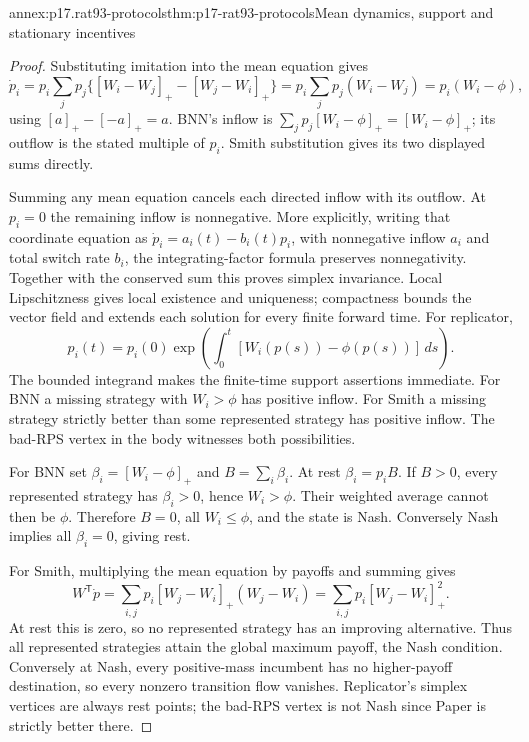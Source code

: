 \begin{annexitem}{annex:p17.rat93-protocols}{thm:p17-rat93-protocols}{Mean dynamics, support and stationary incentives}
\begin{proof}
Substituting imitation into the mean equation gives
\[
 \dot p_i=p_i\sum_jp_j\{[W_i-W_j]_+-[W_j-W_i]_+\}
          =p_i\sum_jp_j(W_i-W_j)=p_i(W_i-\phi),
\]
using \([a]_+-[-a]_+=a\). BNN's inflow is
\(\sum_jp_j[W_i-\phi]_+=[W_i-\phi]_+\); its outflow is
the stated multiple of \(p_i\). Smith substitution gives its two
displayed sums directly.

Summing any mean equation cancels each directed inflow with its
outflow. At \(p_i=0\) the remaining inflow is nonnegative. More
explicitly, writing that coordinate equation as
\(\dot p_i=a_i(t)-b_i(t)p_i\), with nonnegative inflow
\(a_i\) and total switch rate \(b_i\), the integrating-factor
formula preserves nonnegativity. Together with the conserved sum
this proves simplex invariance. Local Lipschitzness gives local
existence and uniqueness; compactness bounds the vector field and
extends each solution for every finite forward time. For replicator,
\[
 p_i(t)=p_i(0)\exp\!\left(\int_0^t[W_i(p(s))-\phi(p(s))]\,ds\right).
\]
The bounded integrand makes the finite-time support assertions immediate.
For BNN a missing strategy with \(W_i>\phi\) has positive inflow.
For Smith a missing strategy strictly better than some represented
strategy has positive inflow. The bad-RPS vertex in the body witnesses
both possibilities.

For BNN set \(\beta_i=[W_i-\phi]_+\) and \(B=\sum_i\beta_i\).
At rest \(\beta_i=p_iB\). If \(B>0\), every represented strategy
has \(\beta_i>0\), hence \(W_i>\phi\). Their weighted average
cannot then be \(\phi\). Therefore \(B=0\), all
\(W_i\leq\phi\), and the state is Nash. Conversely Nash implies
all \(\beta_i=0\), giving rest.

For Smith, multiplying the mean equation by payoffs and summing gives
\[
 W^{\mathsf T}\dot p
  =\sum_{i,j}p_i[W_j-W_i]_+(W_j-W_i)
  =\sum_{i,j}p_i[W_j-W_i]_+^2.
\]
At rest this is zero, so no represented strategy has an improving
alternative. Thus all represented strategies attain the global maximum
payoff, the Nash condition. Conversely at Nash, every positive-mass
incumbent has no higher-payoff destination, so every nonzero transition
flow vanishes. Replicator's simplex vertices are always rest points;
the bad-RPS vertex is not Nash since Paper is strictly better there.
\end{proof}
\end{annexitem}

